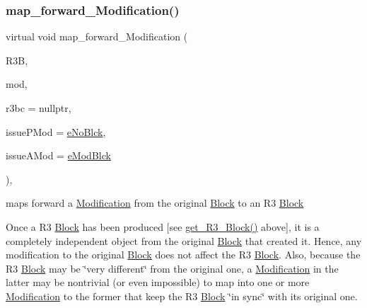 \subsubsection{\texorpdfstring{map\+\_\+forward\+\_\+\+Modification()}{map\_forward\_Modification()}}
{\footnotesize\ttfamily virtual void map\+\_\+forward\+\_\+\+Modification (\begin{DoxyParamCaption}\item[{\mbox{\hyperlink{class_s_m_spp__di__unipi__it_1_1_block}{Block}} $\ast$}]{R3B,  }\item[{\mbox{\hyperlink{group___modification___t_y_p_e_s_ga9024cf2ead61a1280d29771b063b1a62}{sp\+\_\+\+Mod}}}]{mod,  }\item[{\mbox{\hyperlink{class_s_m_spp__di__unipi__it_1_1_configuration}{Configuration}} $\ast$}]{r3bc = {\ttfamily nullptr},  }\item[{\mbox{\hyperlink{group___modification___t_y_p_e_s_ga544246d8c462e9a2d817c2c30797968f}{c\+\_\+\+Mod\+Param}}}]{issue\+P\+Mod = {\ttfamily \mbox{\hyperlink{group___modification___t_y_p_e_s_gga48fddcdd03a03f49b7e389ca1ed938d4ada69e89c5f46e563d8a13cfa6830c136}{e\+No\+Blck}}},  }\item[{\mbox{\hyperlink{group___modification___t_y_p_e_s_ga544246d8c462e9a2d817c2c30797968f}{c\+\_\+\+Mod\+Param}}}]{issue\+A\+Mod = {\ttfamily \mbox{\hyperlink{group___modification___t_y_p_e_s_gga48fddcdd03a03f49b7e389ca1ed938d4a21b14b26b1c0093a0905f6fc010bad29}{e\+Mod\+Blck}}} }\end{DoxyParamCaption})\hspace{0.3cm}{\ttfamily [inline]}, {\ttfamily [virtual]}}



maps forward a \mbox{\hyperlink{class_s_m_spp__di__unipi__it_1_1_modification}{Modification}} from the original \mbox{\hyperlink{class_s_m_spp__di__unipi__it_1_1_block}{Block}} to an R3 \mbox{\hyperlink{class_s_m_spp__di__unipi__it_1_1_block}{Block}} 

Once a R3 \mbox{\hyperlink{class_s_m_spp__di__unipi__it_1_1_block}{Block}} has been produced \mbox{[}see \mbox{\hyperlink{class_s_m_spp__di__unipi__it_1_1_block_a2e682f5c0d4a74503c0cb5ab38fb6428}{get\+\_\+\+R3\+\_\+\+Block()}} above\mbox{]}, it is a completely independent object from the original \mbox{\hyperlink{class_s_m_spp__di__unipi__it_1_1_block}{Block}} that created it. Hence, any modification to the original \mbox{\hyperlink{class_s_m_spp__di__unipi__it_1_1_block}{Block}} does not affect the R3 \mbox{\hyperlink{class_s_m_spp__di__unipi__it_1_1_block}{Block}}. Also, because the R3 \mbox{\hyperlink{class_s_m_spp__di__unipi__it_1_1_block}{Block}} may be \char`\"{}very different\char`\"{} from the original one, a \mbox{\hyperlink{class_s_m_spp__di__unipi__it_1_1_modification}{Modification}} in the latter may be nontrivial (or even impossible) to map into one or more \mbox{\hyperlink{class_s_m_spp__di__unipi__it_1_1_modification}{Modification}} to the former that keep the R3 \mbox{\hyperlink{class_s_m_spp__di__unipi__it_1_1_block}{Block}} \char`\"{}in sync\char`\"{} with its original one.

